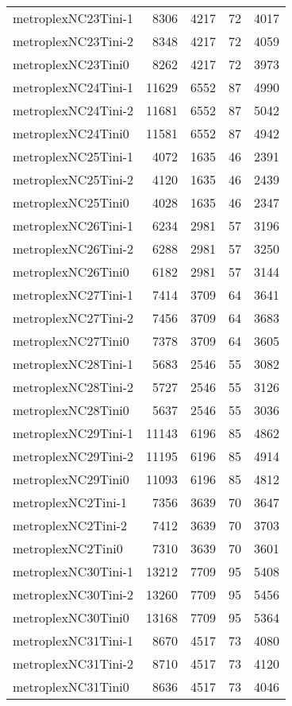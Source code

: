 \begin{longtable}{lrrrr}
metroplexNC23Tini-1 & 8306 & 4217 & 72 & 4017 \\
metroplexNC23Tini-2 & 8348 & 4217 & 72 & 4059 \\
metroplexNC23Tini0 & 8262 & 4217 & 72 & 3973 \\
metroplexNC24Tini-1 & 11629 & 6552 & 87 & 4990 \\
metroplexNC24Tini-2 & 11681 & 6552 & 87 & 5042 \\
metroplexNC24Tini0 & 11581 & 6552 & 87 & 4942 \\
metroplexNC25Tini-1 & 4072 & 1635 & 46 & 2391 \\
metroplexNC25Tini-2 & 4120 & 1635 & 46 & 2439 \\
metroplexNC25Tini0 & 4028 & 1635 & 46 & 2347 \\
metroplexNC26Tini-1 & 6234 & 2981 & 57 & 3196 \\
metroplexNC26Tini-2 & 6288 & 2981 & 57 & 3250 \\
metroplexNC26Tini0 & 6182 & 2981 & 57 & 3144 \\
metroplexNC27Tini-1 & 7414 & 3709 & 64 & 3641 \\
metroplexNC27Tini-2 & 7456 & 3709 & 64 & 3683 \\
metroplexNC27Tini0 & 7378 & 3709 & 64 & 3605 \\
metroplexNC28Tini-1 & 5683 & 2546 & 55 & 3082 \\
metroplexNC28Tini-2 & 5727 & 2546 & 55 & 3126 \\
metroplexNC28Tini0 & 5637 & 2546 & 55 & 3036 \\
metroplexNC29Tini-1 & 11143 & 6196 & 85 & 4862 \\
metroplexNC29Tini-2 & 11195 & 6196 & 85 & 4914 \\
metroplexNC29Tini0 & 11093 & 6196 & 85 & 4812 \\
metroplexNC2Tini-1 & 7356 & 3639 & 70 & 3647 \\
metroplexNC2Tini-2 & 7412 & 3639 & 70 & 3703 \\
metroplexNC2Tini0 & 7310 & 3639 & 70 & 3601 \\
metroplexNC30Tini-1 & 13212 & 7709 & 95 & 5408 \\
metroplexNC30Tini-2 & 13260 & 7709 & 95 & 5456 \\
metroplexNC30Tini0 & 13168 & 7709 & 95 & 5364 \\
metroplexNC31Tini-1 & 8670 & 4517 & 73 & 4080 \\
metroplexNC31Tini-2 & 8710 & 4517 & 73 & 4120 \\
metroplexNC31Tini0 & 8636 & 4517 & 73 & 4046 \\

\end{longtable}
